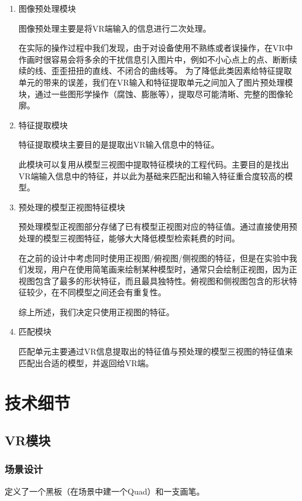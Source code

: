 \documentclass{article}
\begin{document}
\begin{enumerate}
    \item 图像预处理模块

\qquad 图像预处理主要是将VR端输入的信息进行二次处理。

\qquad 在实际的操作过程中我们发现，由于对设备使用不熟练或者误操作，在VR中作画时很容易会将多余的干扰信息引入图片中，例如不小心点上的点、断断续续的线、歪歪扭扭的直线、不闭合的曲线等。
为了降低此类因素给特征提取单元的带来的误差，我们在VR输入和特征提取单元之间加入了图片预处理模块，通过一些图形学操作（腐蚀、膨胀等），提取尽可能清晰、完整的图像轮廓。
    
    
    \item 特征提取模块
    
\qquad 特征提取模块主要目的是提取出VR输入信息中的特征。

\qquad 此模块可以复用从模型三视图中提取特征模块的工程代码。主要目的是找出VR端输入信息中的特征，并以此为基础来匹配出和输入特征重合度较高的模型。
    
    \item 预处理的模型正视图特征模块

\qquad 预处理模型正视图部分存储了已有模型正视图对应的特征值。通过直接使用预处理的模型三视图特征，能够大大降低模型检索耗费的时间。

\qquad 在之前的设计中考虑同时使用正视图/俯视图/侧视图的特征，但是在实验中我们发现，用户在使用简笔画来绘制某种模型时，通常只会绘制正视图，因为正视图包含了最多的形状特征，而且最具独特性。俯视图和侧视图包含的形状特征较少，在不同模型之间还会有重复性。

\qquad 综上所述，我们决定只使用正视图的特征。
    
    \item 匹配模块

\qquad 匹配单元主要通过VR信息提取出的特征值与预处理的模型三视图的特征值来匹配出合适的模型，并返回给VR端。

\end{enumerate}

\section{技术细节}

\subsection{VR模块}

\subsubsection{场景设计}
定义了一个黑板（在场景中建一个Quad）和一支画笔。
\end{document}

